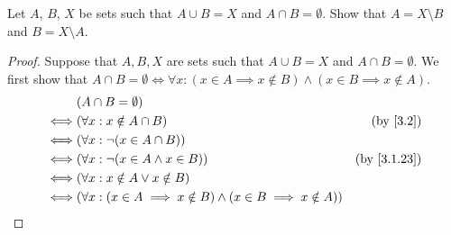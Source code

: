 \begin{ex}\label{ex:3.1.9}
  Let \(A\), \(B\), \(X\) be sets such that \(A \cup B = X\) and \(A \cap B = \emptyset\).
  Show that \(A = X \setminus B\) and \(B = X \setminus A\).
\end{ex}

\begin{proof}
  Suppose that \(A, B, X\) are sets such that \(A \cup B = X\) and \(A \cap B = \emptyset\).
  We first show that \(A \cap B = \emptyset \iff \forall x : (x \in A \implies x \notin B) \land (x \in B \implies x \notin A)\).
  \begin{align*}
         & (A \cap B = \emptyset)                                                                                      \\
    \iff & (\forall x : x \notin A \cap B)                                                 & \text{(by \cref{3.2})}    \\
    \iff & (\forall x : \lnot (x \in A \cap B))                                                                        \\
    \iff & (\forall x : \lnot (x \in A \land x \in B))                                     & \text{(by \cref{3.1.23})} \\
    \iff & (\forall x : x \notin A \lor x \notin B)                                                                    \\
    \iff & (\forall x : (x \in A \implies x \notin B) \land (x \in B \implies x \notin A))                             \\
  \end{align*}


\end{proof}
